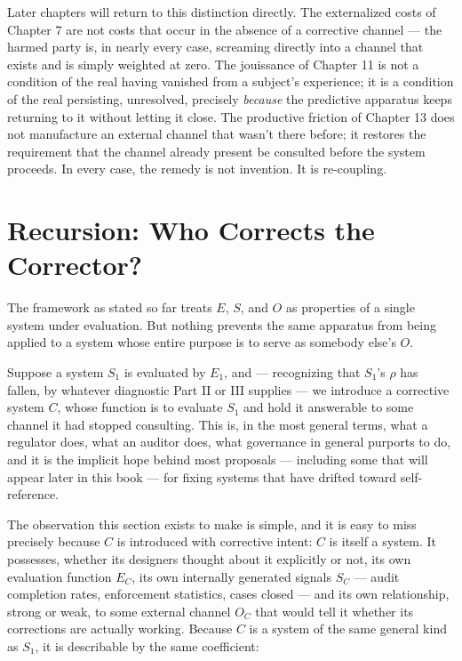 \documentclass[12pt,a4paper]{book}
\begin{document}
Later chapters will return to this distinction directly. The externalized costs of Chapter 7 are not costs that occur in the absence of a corrective channel — the harmed party is, in nearly every case, screaming directly into a channel that exists and is simply weighted at zero. The jouissance of Chapter 11 is not a condition of the real having vanished from a subject's experience; it is a condition of the real persisting, unresolved, precisely \emph{because} the predictive apparatus keeps returning to it without letting it close. The productive friction of Chapter 13 does not manufacture an external channel that wasn't there before; it restores the requirement that the channel already present be consulted before the system proceeds. In every case, the remedy is not invention. It is re-coupling.

\section{Recursion: Who Corrects the Corrector?}

The framework as stated so far treats $E$, $S$, and $O$ as properties of a single system under evaluation. But nothing prevents the same apparatus from being applied to a system whose entire purpose is to serve as somebody else's $O$.

Suppose a system $S_1$ is evaluated by $E_1$, and — recognizing that $S_1$'s $\rho$ has fallen, by whatever diagnostic Part II or III supplies — we introduce a corrective system $C$, whose function is to evaluate $S_1$ and hold it answerable to some channel it had stopped consulting. This is, in the most general terms, what a regulator does, what an auditor does, what governance in general purports to do, and it is the implicit hope behind most proposals — including some that will appear later in this book — for fixing systems that have drifted toward self-reference.

The observation this section exists to make is simple, and it is easy to miss precisely because $C$ is introduced with corrective intent: $C$ is itself a system. It possesses, whether its designers thought about it explicitly or not, its own evaluation function $E_C$, its own internally generated signals $S_C$ — audit completion rates, enforcement statistics, cases closed — and its own relationship, strong or weak, to some external channel $O_C$ that would tell it whether its corrections are actually working. Because $C$ is a system of the same general kind as $S_1$, it is describable by the same coefficient:
\end{document}
